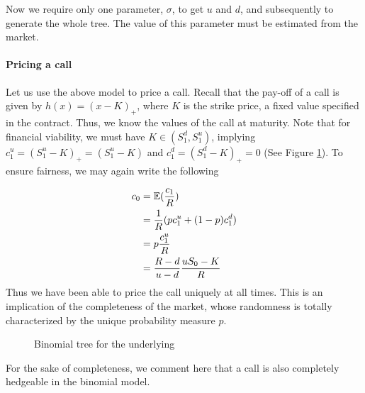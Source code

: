 Now we require only one parameter, $ \sigma $, to get $ u $ and $ d $, and subsequently to generate the whole tree. The value of this parameter must be estimated from the market.


\paragraph{Pricing a call}


Let us use the above model to price a call. Recall that the pay-off of a call is given by $ h(x) = (x - K)_+ $, where $ K $ is the strike price, a fixed value specified in the contract. Thus, we know the values of the call at maturity. Note that for financial viability, we must have $ K \in (S_1^d, S_1^u) $, implying $ c_1^u = (S_1^u - K)_+ = (S_1^u - K) $ and $ c_1^d = (S_1^d - K)_+ = 0 $ (See Figure \ref{fig:discrete-2tr-call}). To ensure fairness, we may again write the following


\begin{align*}
	c_0 &= \operatorname{\mathbb{E}}(\frac{c_1}{R}) \\
	    &= \frac{1}{R} ( p c_1^u + (1-p) c_1^d ) \\
	    &= p \frac{c_1^u}{R} \\
	    &= \frac{R - d}{u - d} \frac{u S_0 - K}{R}
\end{align*}
Thus we have been able to price the call uniquely at all times. This is an implication of the completeness of the market, whose randomness is totally characterized by the unique probability measure $ p $.


\begin{figure}
	
	\caption{Binomial tree for the underlying}
	\label{fig:discrete-2tr-call}
\end{figure}


For the sake of completeness, we comment here that a call is also completely hedgeable in the binomial model.






